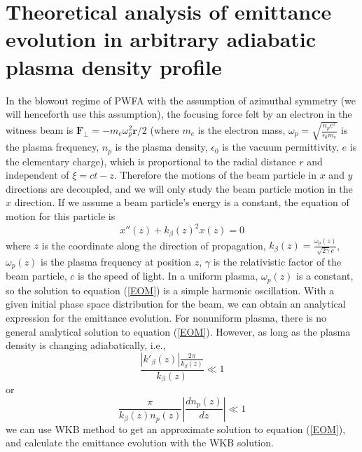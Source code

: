 \documentclass[%
reprint, superscriptaddress,
 amsmath,amssymb, aps,
prstab,
]{revtex4-2}
\begin{document}
\section{Theoretical analysis of emittance evolution in arbitrary
adiabatic plasma density profile} In the blowout regime of PWFA with the
assumption of azimuthal symmetry (we will henceforth use this assumption),
the focusing force felt by an electron in the witness beam is
$\textbf{F}_{\perp} = -m_e\omega_p^2\textbf{r}/2$ (where $m_e$ is the electron mass,
$\omega_p =\sqrt{\frac{n_pe^2}{\epsilon_0 m_e}}$ is the plasma frequency, $n_p$ is the plasma density, $\epsilon_0$ is the vacuum permittivity, $e$ is the elementary charge), which is proportional to the radial
distance $r$ and independent of $\xi = ct - z$. Therefore the motions of
the beam particle in $x$ and $y$ directions are decoupled, and we will
only study the beam particle motion in the $x$ direction. If we assume a
beam particle's energy is a constant, the equation of motion for this
particle is \begin{equation} x''(z)  + k_{\beta}(z)^2 x(z) = 0  \label{EOM} \end{equation} 
where $z$ is the coordinate
along the direction of propagation, $k_{\beta}(z) = \frac{\omega_p(z)}{\sqrt{2\gamma}
c}$,  $\omega_p(z)$ is the plasma frequency at position
$z$, $\gamma$ is the relativistic factor of
the beam particle, $c$ is the speed of light. In a uniform plasma, $\omega_p(z)$ is a constant, so the solution to
equation (\ref{EOM}) is a simple harmonic oscillation. With a given
initial phase space distribution for the beam, we can obtain an analytical
expression for the emittance evolution\cite{Xinlu2016,German2018}.
For nonuniform plasma, there is no general analytical solution to
equation (\ref{EOM}). However, as long as the plasma density is changing
adiabatically, i.e., 
\begin{equation}
\frac{|k'_{\beta}(z)| \frac{2\pi}{k_{\beta}(z)} }{k_{\beta}(z)} \ll 1
\label{adiabatic_condition} 
\end{equation}
or 
\[
	\frac{\pi}{k_{\beta}(z)n_p(z)} \left|\frac{dn_p(z)}{dz}\right| \ll 1
\]
 we can use WKB method \cite{Griffiths} to get an approximate
solution to equation (\ref{EOM}), and calculate the emittance evolution
with the WKB solution.
\end{document}
